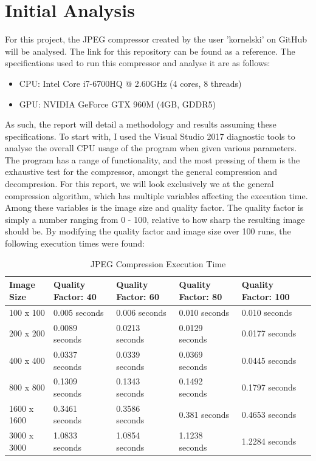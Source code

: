 \documentclass[12pt, a4paper]{article}
\begin{document}
\section{Initial Analysis}

For this project, the JPEG compressor created by the user 'kornelski' on GitHub will be analysed. The link for this repository can be found as a reference. The specifications used to run this compressor and analyse it are as follows:

\begin{itemize}
\item CPU: Intel Core i7-6700HQ @ 2.60GHz (4 cores, 8 threads)
\item GPU: NVIDIA GeForce GTX 960M (4GB, GDDR5) \\
\end{itemize}

As such, the report will detail a methodology and results assuming these specifications. To start with, I used the Visual Studio 2017 diagnostic tools to analyse the overall CPU usage of the program when given various parameters. The program has a range of functionality, and the most pressing of them is the exhaustive test for the compressor, amongst the general compression and decompresion. For this report, we will look exclusively we at the general compression algorithm, which has multiple variables affecting the execution time. Among these variables is the image size and quality factor. The quality factor is simply a number ranging from 0 - 100, relative to how sharp the resulting image should be. By modifying the quality factor and image size over 100 runs, the following execution times were found: \\

\begin{table}[H]
    \centering
    \begin{tabular}{| l | l | l | l | l | l |}
    \hline
    Image Size & Quality Factor: 40 & Quality Factor: 60 & Quality Factor: 80 & Quality Factor: 100  \\ \hline
    100 x 100 & 0.005 seconds & 0.006 seconds & 0.010 seconds & 0.010 seconds \\ \hline
    200 x 200 & 0.0089 seconds & 0.0213 seconds & 0.0129 seconds & 0.0177 seconds \\ \hline
    400 x 400 & 0.0337 seconds & 0.0339 seconds & 0.0369 seconds & 0.0445 seconds \\ \hline
    800 x 800 & 0.1309 seconds & 0.1343 seconds & 0.1492 seconds & 0.1797 seconds \\ \hline
    1600 x 1600 & 0.3461 seconds & 0.3586 seconds & 0.381 seconds & 0.4653 seconds \\ \hline
    3000 x 3000 & 1.0833 seconds & 1.0854 seconds & 1.1238 seconds & 1.2284 seconds \\ \hline
    \end{tabular}
    \caption{JPEG Compression Execution Time}
\end{table}
\end{document}
